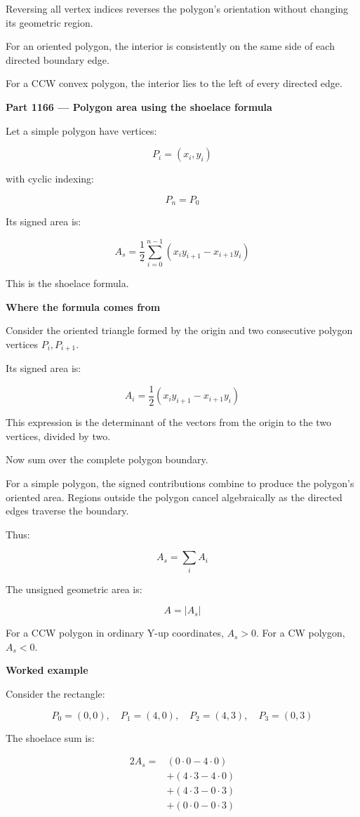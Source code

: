 Reversing all vertex indices reverses the polygon's orientation without changing its geometric region.

For an oriented polygon, the interior is consistently on the same side of each directed boundary edge.

For a CCW convex polygon, the interior lies to the left of every directed edge.

\textbf{Part 1166 --- Polygon area using the shoelace formula}

Let a simple polygon have vertices:

\[
P_i=(x_i,y_i)
\]

with cyclic indexing:

\[
P_n=P_0
\]

Its signed area is:

\[
\boxed{ A_s= \frac12 \sum_{i=0}^{n-1} (x_iy_{i+1}-x_{i+1}y_i) }
\]

This is the shoelace formula.

\textbf{Where the formula comes from}

Consider the oriented triangle formed by the origin and two consecutive polygon vertices \(P_i,P_{i+1}\).

Its signed area is:

\[
A_i=\frac12(x_iy_{i+1}-x_{i+1}y_i)
\]

This expression is the determinant of the vectors from the origin to the two vertices, divided by two.

Now sum over the complete polygon boundary.

For a simple polygon, the signed contributions combine to produce the polygon's oriented area. Regions outside the polygon cancel algebraically as the directed edges traverse the boundary.

Thus:

\[
A_s=\sum_i A_i
\]

The unsigned geometric area is:

\[
\boxed{A=|A_s|}
\]

For a CCW polygon in ordinary Y-up coordinates, \(A_s>0\). For a CW polygon, \(A_s<0\).

\textbf{Worked example}

Consider the rectangle:

\[
P_0=(0,0),\quad P_1=(4,0),\quad P_2=(4,3),\quad P_3=(0,3)
\]

The shoelace sum is:

\[
\begin{aligned} 2A_s={}&(0\cdot0-4\cdot0)\\\ &+(4\cdot3-4\cdot0)\\\ &+(4\cdot3-0\cdot3)\\\ &+(0\cdot0-0\cdot3) \end{aligned}
\]

